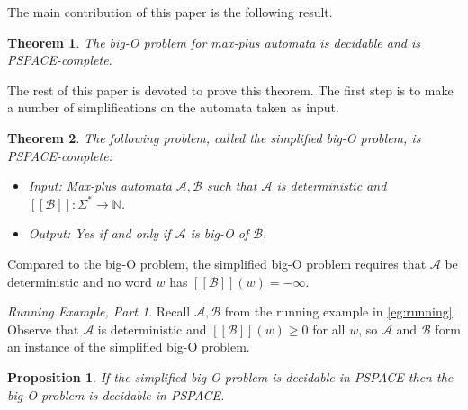 \documentclass[10pt,a4paper]{amsart}
\newtheorem{thm}{Theorem}[section]
\newtheorem{prop}[prop]{Proposition}
\theoremstyle{definition}
\numberwithin{equation}{section}
\theoremstyle{remark}
\newcommand{\N}{\mathbb{N}}
\newcommand{\autA}{\mathcal{A}}
\newcommand{\autB}{\mathcal{B}}
\newcommand{\brfunc}[1]{[\![#1]\!]}
\newcommand{\funcB}{\brfunc{\autB}}
\theoremstyle{remark}
\newtheorem{runningexample/}{Running Example, Part}
\newenvironment{runningexample}
  {\renewcommand{\qedsymbol}{\color{darkgray}\ensuremath{\lrcorner}}%
   \pushQED{\qed}\begin{runningexample/}}
  {\popQED\end{runningexample/}}
\begin{document}
The main contribution of this paper is the following result.


\begin{thm}\label{thm:main}
The big-O problem for max-plus automata is decidable and is PSPACE-complete.
\end{thm}



The rest of this paper is devoted to prove this theorem. The first step is to make a number of simplifications on the automata taken as input.

\begin{thm}\label{thm:main-simplified}
The following problem, called the \emph{simplified big-O problem}, is PSPACE-complete: 
\begin{itemize}
\item Input: Max-plus automata $\autA,\autB$ such that $\autA$ is deterministic and $\funcB:\Sigma^* \to \N$.
\item Output: Yes if and only if $\autA$ is big-O of $\autB$.
\end{itemize}
\end{thm}
Compared to the big-O problem, the simplified big-O problem requires that $\autA$ be deterministic and no word $w$ has $\funcB(w) = -\infty$. 

\begin{runningexample}
Recall $\autA,\autB$ from the running example in \cref{eg:running}. Observe that $\autA$ is deterministic and $\funcB(w) \ge 0$ for all $w$, so $\autA$ and $\autB$ form an instance of the simplified big-O problem.
\end{runningexample}

\begin{prop}\label{prop:tosimplified}
If the simplified big-O problem is decidable in PSPACE then the big-O problem is decidable in PSPACE.
\end{prop}
\end{document}
